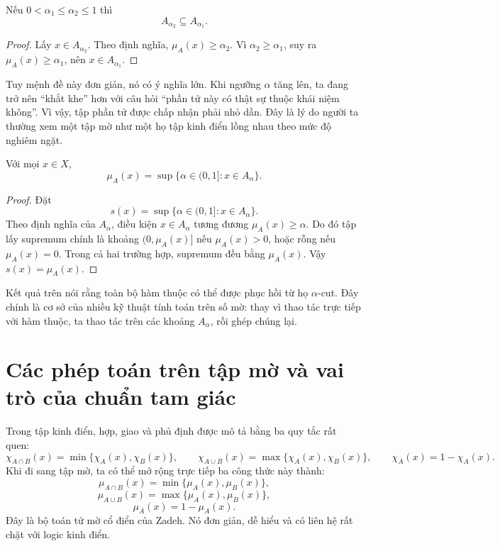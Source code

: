 \begin{proposition}
Nếu \(0<\alpha_1\le \alpha_2\le 1\) thì
\[
A_{\alpha_2}\subseteq A_{\alpha_1}.
\]
\end{proposition}

\begin{proof}
Lấy \(x\in A_{\alpha_2}\). Theo định nghĩa, \(\mu_A(x)\ge \alpha_2\). Vì \(\alpha_2\ge \alpha_1\), suy ra \(\mu_A(x)\ge \alpha_1\), nên \(x\in A_{\alpha_1}\).
\end{proof}

Tuy mệnh đề này đơn giản, nó có ý nghĩa lớn. Khi ngưỡng \(\alpha\) tăng lên, ta đang trở nên ``khắt khe'' hơn với câu hỏi ``phần tử này có thật sự thuộc khái niệm không''. Vì vậy, tập phần tử được chấp nhận phải nhỏ dần. Đây là lý do người ta thường xem một tập mờ như một họ tập kinh điển lồng nhau theo mức độ nghiêm ngặt.

\begin{proposition}
Với mọi \(x\in X\),
\[
\mu_A(x)=\sup\{\alpha\in(0,1]:x\in A_\alpha\}.
\]
\end{proposition}

\begin{proof}
Đặt
\[
s(x)=\sup\{\alpha\in(0,1]:x\in A_\alpha\}.
\]
Theo định nghĩa của \(A_\alpha\), điều kiện \(x\in A_\alpha\) tương đương \(\mu_A(x)\ge \alpha\). Do đó tập lấy supremum chính là khoảng \((0,\mu_A(x)]\) nếu \(\mu_A(x)>0\), hoặc rỗng nếu \(\mu_A(x)=0\). Trong cả hai trường hợp, supremum đều bằng \(\mu_A(x)\). Vậy \(s(x)=\mu_A(x)\).
\end{proof}

Kết quả trên nói rằng toàn bộ hàm thuộc có thể được phục hồi từ họ \(\alpha\)-cut. Đây chính là cơ sở của nhiều kỹ thuật tính toán trên số mờ: thay vì thao tác trực tiếp với hàm thuộc, ta thao tác trên các khoảng \(A_\alpha\), rồi ghép chúng lại.

\section{Các phép toán trên tập mờ và vai trò của chuẩn tam giác}

Trong tập kinh điển, hợp, giao và phủ định được mô tả bằng ba quy tắc rất quen:
\[
\chi_{A\cap B}(x)=\min\{\chi_A(x),\chi_B(x)\},
\qquad
\chi_{A\cup B}(x)=\max\{\chi_A(x),\chi_B(x)\},
\qquad
\chi_{\bar A}(x)=1-\chi_A(x).
\]
Khi đi sang tập mờ, ta có thể mở rộng trực tiếp ba công thức này thành:
\[
\mu_{A\cap B}(x)=\min\{\mu_A(x),\mu_B(x)\},
\]
\[
\mu_{A\cup B}(x)=\max\{\mu_A(x),\mu_B(x)\},
\]
\[
\mu_{\bar A}(x)=1-\mu_A(x).
\]
Đây là bộ toán tử mờ cổ điển của Zadeh. Nó đơn giản, dễ hiểu và có liên hệ rất chặt với logic kinh điển.

